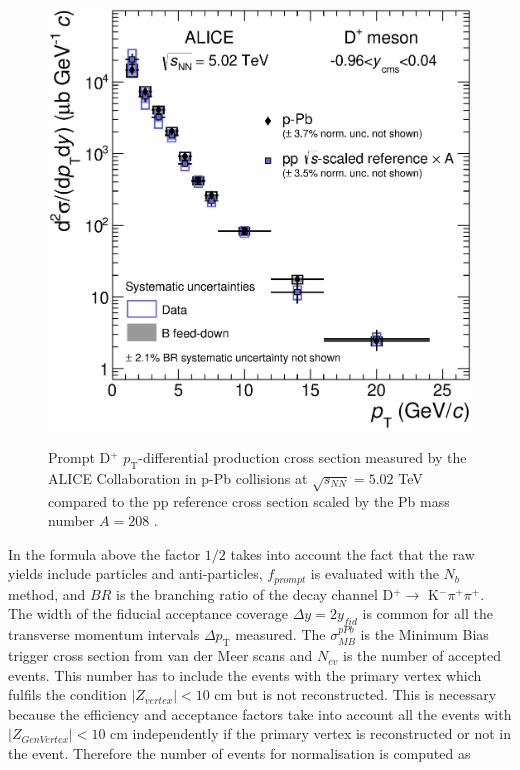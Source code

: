 \documentclass[b5paper,10pt,twoside,oldstyle,classica]{toptesi}
\newcommand{\pt}{p_\text{T}}
\begin{document}
\begin{figure}[tb]
\begin{center}
{\includegraphics[scale = 0.4]{Dplus-dsigmadpt-pPb.eps}}
\caption{Prompt D$^+$ $\pt$-differential production cross section measured by the ALICE Collaboration in p-Pb collisions at $\sqrt{s_{NN}}=5.02$ TeV compared to the pp reference cross section scaled by the Pb mass number $A=208$ \cite{Abelev:2014hha}.}
\label{paper_result}
\end{center}
\end{figure} In the formula above the factor $1/2$ takes into account the fact that the raw yields include particles and anti-particles, $f_{prompt}$ is evaluated with the $N_b$ method, and $BR$ is the branching ratio of the decay channel D$^+ \rightarrow$ K$^-\pi^+\pi^+$. The width of the fiducial acceptance coverage $\Delta y = 2y_{fid}$ is common for all the transverse momentum intervals $\Delta \pt$ measured. The $\sigma^{pPb}_{MB}$ is the Minimum Bias trigger cross section from van der Meer scans and $N_{ev}$ is the number of accepted events. This number has to include the events with the primary vertex which fulfils the condition $|Z_{vertex}|<10$ cm but is not reconstructed. This is necessary because the efficiency and acceptance factors take into account all the events with $|Z_{GenVertex}|<10$ cm independently if the primary vertex is reconstructed or not in the event. Therefore the number of events for normalisation is computed as
\end{document}
